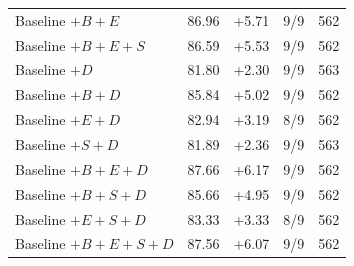 \begin{longtable}{@{}lrrrr@{}}
Baseline $+B+E$ & 86.96 & +5.71 & 9/9 & 562 \\
Baseline $+B+E+S$ & 86.59 & +5.53 & 9/9 & 562 \\
Baseline $+D$ & 81.80 & +2.30 & 9/9 & 563 \\
Baseline $+B+D$ & 85.84 & +5.02 & 9/9 & 562 \\
Baseline $+E+D$ & 82.94 & +3.19 & 8/9 & 562 \\
Baseline $+S+D$ & 81.89 & +2.36 & 9/9 & 563 \\
Baseline $+B+E+D$ & 87.66 & +6.17 & 9/9 & 562 \\
Baseline $+B+S+D$ & 85.66 & +4.95 & 9/9 & 562 \\
Baseline $+E+S+D$ & 83.33 & +3.33 & 8/9 & 562 \\
Baseline $+B+E+S+D$ & 87.56 & +6.07 & 9/9 & 562 \\
\end{longtable}\endgroup

